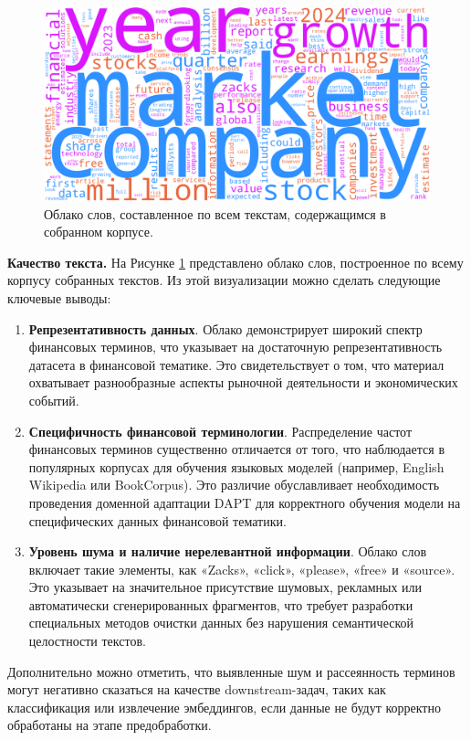 \begin{figure}[H]
    \centering
    \includegraphics[width=1\linewidth]{img/wordcloud.png}
    \caption{\label{fig:wordcloud}Облако слов, составленное по всем текстам, содержащимся в собранном корпусе.}
\end{figure}

\textbf{Качество текста.} На Рисунке \ref{fig:wordcloud} представлено облако слов, построенное по всему
корпусу собранных текстов. Из этой визуализации можно сделать следующие ключевые выводы:

\begin{enumerate}
    \item \textbf{Репрезентативность данных}. Облако демонстрирует широкий спектр финансовых терминов, что указывает на достаточную репрезентативность
    датасета в финансовой тематике. Это свидетельствует о том, что материал охватывает разнообразные аспекты рыночной деятельности и экономических событий.
    \item \textbf{Специфичность финансовой терминологии}. Распределение частот финансовых терминов существенно отличается от того,
    что наблюдается в популярных корпусах для обучения языковых моделей (например, English Wikipedia или BookCorpus).
    Это различие обуславливает необходимость проведения доменной адаптации DAPT для корректного обучения модели на специфических данных
    финансовой тематики.
    \item \textbf{Уровень шума и наличие нерелевантной информации}. Облако слов включает такие элементы, как «Zacks», «click»,
    «please», «free» и «source». Это указывает на значительное присутствие шумовых, рекламных или автоматически сгенерированных
    фрагментов, что требует разработки специальных методов очистки данных без нарушения семантической целостности текстов.
\end{enumerate}

Дополнительно можно отметить, что выявленные шум и рассеянность терминов могут негативно сказаться на качестве downstream-задач, таких как классификация
или извлечение эмбеддингов, если данные не будут корректно обработаны на этапе предобработки.

